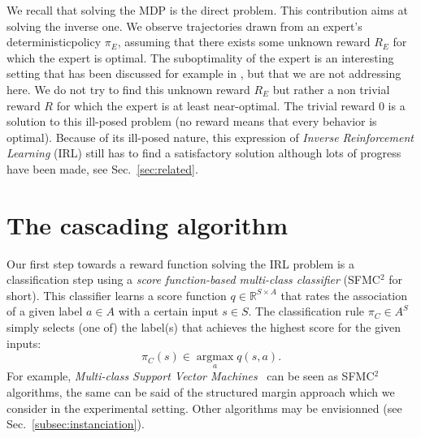 \documentclass[smallextended]{svjour3}
\newcommand{\argmax}{\operatorname*{argmax}} %
\begin{document}
We recall that solving the MDP is the direct problem. This contribution aims at solving the inverse one. We observe trajectories drawn from an expert's deterministic\footnotemark[\value{footnote}] policy $\pi_E$, assuming that there exists some unknown reward $R_E$ for which the expert is optimal. The suboptimality of the expert is an interesting setting that has been discussed for example in \cite{melo2010analysis,syed2010reduction}, but that we are not addressing here. We do not try to find this unknown reward $R_E$ but rather a non trivial reward $R$ for which the expert is at least near-optimal. The trivial reward $0$ is a solution to this ill-posed problem (no reward means that every behavior is optimal). Because of its ill-posed nature, this expression of \emph{Inverse Reinforcement Learning} (IRL) still has to find a satisfactory solution although lots of progress have been made, see Sec.~\ref{sec:related}.
\section{The cascading algorithm}
\label{sec:algo}
Our first step towards a reward function solving the IRL problem is a classification step using a \emph{score function-based multi-class classifier} (SFMC$^2$ for short). This classifier learns a score function $q\in\mathbb{R}^{S\times A}$ that rates the association of a given label $a\in A$ with a certain input $s\in S$. The classification rule $\pi_C\in A^S$ simply selects (one of) the label(s) that achieves the highest score for the given inputs:
\begin{equation}
  \label{eq:greedy2}
\pi_C(s) \in \argmax_a q(s,a).
\end{equation}
For example, \emph{Multi-class Support Vector Machines}~\cite{guermeur2011generic} can be seen as SFMC$^2$ algorithms, the same can be said of the structured margin approach \cite{taskar2005learning} which we consider in the experimental setting. Other algorithms may be envisionned (see Sec.~\ref{subsec:instanciation}). 
\end{document}
